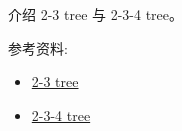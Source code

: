 \documentclass[a4paper, justified]{tufte-handout}
\begin{document}
\beginot

\begin{ot}
  介绍 2-3 tree 与 2-3-4 tree。

  \noindent 参考资料:
  \begin{itemize}
    \item \href{https://en.wikipedia.org/wiki/2\%E2\%80\%933\_tree}{2-3 tree}
    \item \href{https://en.wikipedia.org/wiki/2\%E2\%80\%933\%E2\%80\%934\_tree}{2-3-4 tree}
  \end{itemize}
\end{ot}

% 




\beginfb

% 
% 
\end{document}
